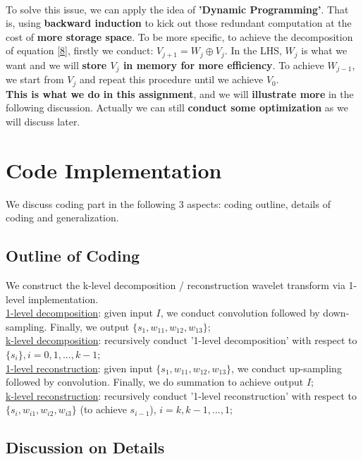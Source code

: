 \documentclass{article}
\begin{document}
\vspace{4pt}
\\
To solve this issue, we can apply the idea of \textbf{'Dynamic Programming'}. That is, using \textbf{backward induction} to kick out those redundant computation at the cost of \textbf{more storage space}. To be more specific, to achieve the decomposition of equation \ref{8}, firstly we conduct: $V_{j+1} = W_j \oplus V_j$. In the LHS, $W_j$ is what we want and we will \textbf{store $V_j$ in memory for more efficiency}. To achieve $W_{j-1}$, we start from $V_j$ and repeat this procedure until we achieve $V_0$.
\vspace{4pt}
\\
\textbf{This is what we do in this assignment}, and we will \textbf{illustrate more} in the following discussion. Actually we can still \textbf{conduct some optimization} as we will discuss later.
\newpage
\section{Code Implementation}
We discuss coding part in the following 3 aspects: coding outline, details of coding and generalization.
\subsection{Outline of Coding}
We construct the k-level decomposition / reconstruction wavelet transform via 1-level implementation.
\vspace{4pt}
\\
\underline{1-level decomposition}: given input $I$, we conduct convolution followed by down-sampling. Finally, we output $\{s_1, w_{11}, w_{12}, w_{13}\}$;
\vspace{4pt}
\\
\underline{k-level decomposition}: recursively conduct '1-level decomposition' with respect to $\{s_i\}, i=0,1,...,k-1$;
\vspace{4pt}
\\
\underline{1-level reconstruction}: given input $\{s_1, w_{11}, w_{12}, w_{13}\}$, we conduct up-sampling followed by convolution. Finally, we do summation to achieve output $I$;
\vspace{4pt}
\\
\underline{k-level reconstruction}: recursively conduct '1-level reconstruction' with respect to $\{s_i, w_{i1}, w_{i2}, w_{i3}\}$ (to achieve $s_{i-1}$), $i = k,k-1,...,1$;
\subsection{Discussion on Details}
\end{document}
